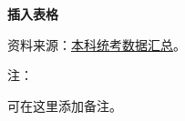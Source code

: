 \documentclass[12pt, aspectratio=169]{beamer}
\begin{document}
\linespread{1}  
\begin{frame}{\textbf{插入表格}}
\linespread{1.5} 

	\begin{table}[htbp]
		\centering %
		\caption{吉林大学本科统考数据汇总(2022/2023年度)} %
		\extrarowheight=2pt %
		\label{loan} %
		\par\smallskip
		\hspace{2em}\parbox{0.8\textwidth}{\scriptsize %
		资料来源：\href{https://zsb.jlu.edu.cn/index/examscores.html}{本科统考数据汇总}。\par
		注：\parbox[t]{0.6\textwidth}{\scriptsize %
		可在这里添加备注。
		}
		}
	\end{table}
	
\end{frame}


\end{document}
